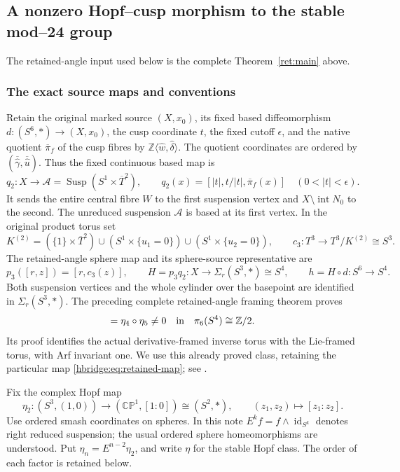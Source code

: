 \documentclass[11pt]{article}
\theoremstyle{definition}
\begin{document}
\subsection{A nonzero Hopf--cusp morphism to the stable mod--24 group}
\label{hbridge:section}
The retained-angle input used below is the complete Theorem~\ref{ret:main} above.

\subsubsection{The exact source maps and conventions}

Retain the original marked source \((X,x_0)\), its fixed based
diffeomorphism \(d:(S^6,*)\to(X,x_0)\), the cusp coordinate \(t\),
the fixed cutoff \(\epsilon\), and the native quotient
\(\overline\pi_f\) of the cusp fibres by
\(\mathbb Z\langle\widehat w,\widehat\delta\rangle\).
The quotient coordinates are ordered by
\((\overline{\widehat\gamma},\overline{\widehat u})\).
Thus the fixed continuous based map is
\[
q_2:X\longrightarrow
\mathcal A=\operatorname{Susp}(S^1\times\overline T^2),
\qquad
q_2(x)=[|t|,t/|t|,\overline\pi_f(x)]
\quad(0<|t|<\epsilon).
\]
It sends the entire central fibre \(W\) to the first suspension
vertex and \(X\setminus\operatorname{int}N_0\) to the second.
The unreduced suspension \(\mathcal A\) is based at its first
vertex. In the original product torus set
\[
K^{(2)}=(\{1\}\times\overline T^2)
\cup(S^1\times\{u_1=0\})
\cup(S^1\times\{u_2=0\}),
\qquad c_3:T^3\longrightarrow T^3/K^{(2)}\cong S^3.
\]
The retained-angle sphere map and its sphere-source representative are
\begin{equation}
p_3([r,z])=[r,c_3(z)],\qquad
H=p_3q_2:X\longrightarrow\Sigma_r(S^3,*)\cong S^4,
\qquad h=H\circ d:S^6\longrightarrow S^4.
\label{hbridge:eq:retained-map}
\end{equation}
Both suspension vertices and the whole cylinder over the basepoint
are identified in \(\Sigma_r(S^3,*)\). The preceding complete
retained-angle framing theorem proves
\begin{equation}
[h]=\eta_4\circ\eta_5\ne0
\quad\hbox{in}\quad\pi_6(S^4)\cong\mathbb Z/2.
\label{hbridge:eq:proved-H}
\end{equation}
Its proof identifies the actual derivative-framed inverse torus
with the Lie-framed torus, with Arf invariant one. We use this
already proved class, retaining the particular map
\eqref{hbridge:eq:retained-map}; see \cite{hbridgebib:HBRetained}.

Fix the complex Hopf map
\[
\eta_2:(S^3,(1,0))\longrightarrow
(\mathbb{CP}^1,[1:0])\cong(S^2,*),\qquad
(z_1,z_2)\longmapsto[z_1:z_2].
\]
Use ordered smash coordinates on spheres. In this note
\(E^k f=f\wedge\operatorname{id}_{S^k}\) denotes right reduced
suspension; the usual ordered sphere homeomorphisms are understood.
Put \(\eta_n=E^{n-2}\eta_2\), and write \(\eta\) for the
stable Hopf class. The order of each factor is retained below.
\end{document}
